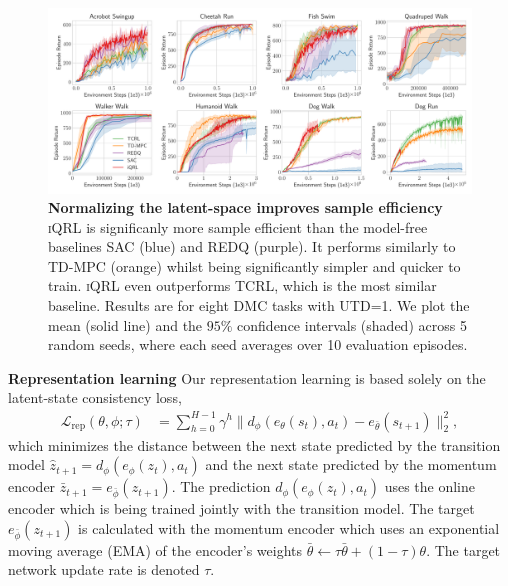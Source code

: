 \documentclass{article}
\theoremstyle{plain}
\theoremstyle{definition}
\theoremstyle{remark}
\newcommand{\our}{\textsc{iQRL}\xspace}
\newcommand{\E}{\mathbb{E}}
\begin{document}
\begin{figure}[ht]
\vskip 0.2in
\begin{center}
\centerline{\includegraphics[width=1.0\textwidth]{./figs/baselines_comparison.pdf}}
\caption{\textbf{Normalizing the latent-space improves sample efficiency} \our is significanly more sample efficient than the model-free baselines SAC (blue) and REDQ (purple). It performs similarly to TD-MPC (orange) whilst being significantly simpler and quicker to train. \our even outperforms TCRL, which is the most similar baseline. Results are for eight DMC tasks with UTD=1. We plot the mean (solid line) and the $95\%$ confidence intervals (shaded) across 5 random seeds, where each seed averages over 10 evaluation episodes.}
\label{fig:normalization_improves_sample_efficiency}
\end{center}
\vskip -0.2in
\end{figure}


\textbf{Representation learning}
Our representation learning is based solely on the latent-state consistency loss,
%
\begin{align} \label{eq:rep-loss}
  \mathcal{L}_{\text{rep}}(\theta, \phi; \tau)
&= \sum_{h=0}^{H-1} \gamma^{h} \| d_{\phi}(e_{\theta}(s_{t}), a_{t}) - e_{\bar{\theta}}(s_{t+1}) \|_{2}^{2},
\end{align}
%
which minimizes the distance between the next state predicted by the transition model $\hat{z}_{t+1} = d_{\phi}(e_{\phi}(z_{t}), a_{t})$
and the next state predicted by the momentum encoder $\bar{z}_{t+1} = e_{\bar{\phi}}(z_{t+1})$.
The prediction $d_{\phi}(e_{\phi}(z_{t}), a_{t})$ uses the online encoder which is being trained jointly with the transition model.
The target $e_{\bar{\phi}}(z_{t+1})$ is calculated with the momentum encoder which uses an exponential moving average (EMA)
of the encoder's weights $\bar{\theta} \leftarrow \tau \bar{\theta} + (1-\tau)\theta$.
The target network update rate is denoted $\tau$.
\end{document}

